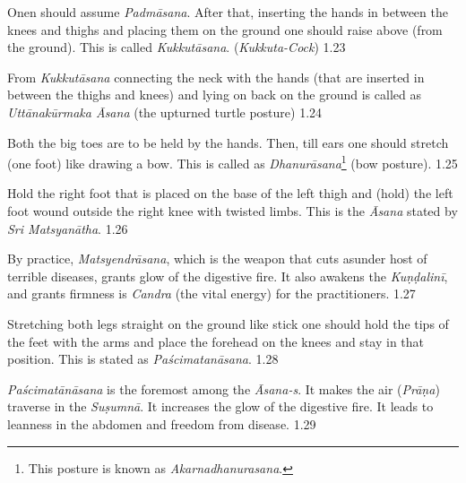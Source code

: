 
\vspace{-5pt}

Onen should assume \textit{Padmāsana}. After that, inserting the hands in between the knees and thighs and placing them on the ground one should raise above (from the ground). This is called \textit{Kukkutāsana}. (\textit{Kukkuta-Cock}) 1.23


From \textit{Kukkutāsana} connecting the neck with the hands (that are inserted in between the thighs and knees) and lying on back on the ground is called as \textit{Uttānakūrmaka Āsana} (the upturned turtle posture) 1.24


Both the big toes are to be held by the hands. Then, till ears one should stretch (one foot)  like drawing a bow. This is called as \textit{Dhanurāsana}\footnote{This posture is known as \textit{Akarnadhanurasana}.} (bow posture). 1.25


Hold the right foot that is placed on the base of the left thigh and (hold) the left foot wound outside the right knee with twisted limbs. This is the \textit{Āsana} stated by \textit{Sri Matsyanātha}. 1.26


By practice, \textit{Matsyendrāsana}, which is the weapon that cuts asunder host of terrible diseases, grants glow of the digestive fire. It also awakens the \textit{Kuṇḍalinī}, and grants firmness is \textit{Candra} (the vital energy) for the practitioners. 1.27
\medskip


Stretching both legs straight on the ground like stick one should hold the tips of the feet with the arms and place the forehead on the knees and stay in that position. This is stated as \textit{Paścimatanāsana}.  1.28



\textit{Paścimatānāsana} is the foremost among the \textit{Āsana-s}. It makes the air (\textit{Prāṇa}) traverse in the \textit{Suṣumnā}. It increases the glow of the digestive fire. It leads to leanness in the abdomen and freedom from disease.  1.29
\medskip

